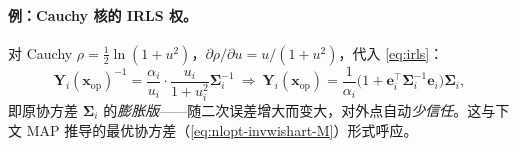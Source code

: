 \paragraph{例：Cauchy 核的 IRLS 权。}\cite{barfoot2024state}
对 Cauchy $\rho=\tfrac12\ln(1+u^2)$，$\partial\rho/\partial u=u/(1+u^2)$，代入 \cref{eq:irls}：
\begin{equation}
  \mathbf{Y}_i(\mathbf{x}_{\mathrm{op}})^{-1}=\frac{\alpha_i}{u_i}\cdot\frac{u_i}{1+u_i^2}\boldsymbol{\Sigma}_i^{-1}
  \ \Rightarrow\ \mathbf{Y}_i(\mathbf{x}_{\mathrm{op}})=\frac{1}{\alpha_i}\big(1+\mathbf{e}_i^\top\boldsymbol{\Sigma}_i^{-1}\mathbf{e}_i\big)\boldsymbol{\Sigma}_i,
  \label{eq:nlopt-cauchy-Y}
\end{equation}
即原协方差 $\boldsymbol{\Sigma}_i$ 的\emph{膨胀版}——随二次误差增大而变大，对外点自动\emph{少信任}。这与下文 MAP 推导的最优协方差（\cref{eq:nlopt-invwishart-M}）形式呼应。

